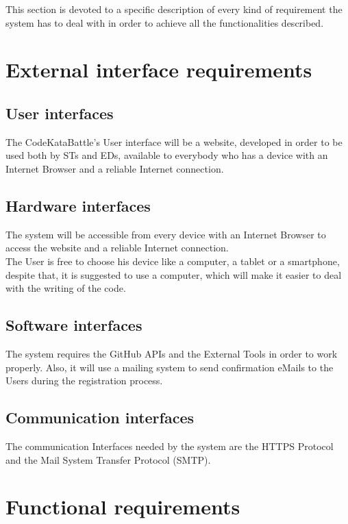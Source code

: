 This section is devoted to a specific description of every kind of requirement the system has to deal with in order to achieve all the functionalities described.


\section{External interface requirements}
\label{sec:external_interface_requirements}%

\subsection{User interfaces}
\label{subsec:User_interfaces}%
The CodeKataBattle’s User interface will be a website, developed in order to be used both by STs and EDs, available to everybody who has a device with an Internet Browser and a reliable Internet connection.

\subsection{Hardware interfaces}
\label{subsec:hardware_interfaces}%
The system will be accessible from every device with an Internet Browser to access the website and a reliable Internet connection.\\
The User is free to choose his device like a computer, a tablet or a smartphone, despite that, it is suggested to use a computer, which will make it easier to deal with the writing of the code.

\subsection{Software interfaces}
\label{subsec:software_interfaces}%
The system requires the GitHub APIs and the External Tools in order to work properly. Also, it will use a mailing system to send confirmation eMails to the Users during the registration process.    

\subsection{Communication interfaces}
\label{subsec:communication_interfaces}%
The communication Interfaces needed by the system are the HTTPS Protocol and the Mail System Transfer Protocol (SMTP).

\section{Functional requirements}
\label{sec:functional_requirements}%

